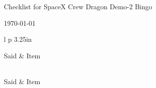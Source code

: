 \documentclass[12pt]{article}
\newcommand{\sep}{1mm}
\newcommand{\negsep}{-3mm}
\begin{document}
\begin{center}
\begin{Large}
Checklist for SpaceX Crew Dragon Demo-2 Bingo
\end{Large}
\vspace{0.15in}



\today

\end{center}

\begin{longtable}{l p {3.25in} }

Said  & Item \\[\sep]
\hline\\[\negsep]
\endfirsthead

Said  & Item \\[\sep]
\hline\\[\negsep]
\endhead

\hline\hline
\endfoot



\end{longtable}
\end{document}
